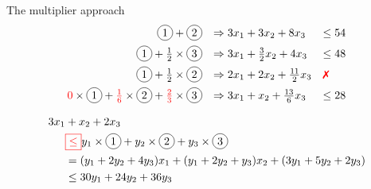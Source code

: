\begin{frame}{The multiplier approach}
  \begin{equation*}
	\setlength\arraycolsep{5pt}
	\begin{array}{rll}
	  \circled{1} + \circled{2} &\Rightarrow	3x_1 + 3x_2 + 8x_3 & \leq 54 \\[5pt]
	  \circled{1} + \frac{1}{2} \times \circled{3} &\Rightarrow 3x_1 + \frac{3}{2}x_2 + 4x_3 & \leq 48 \\[5pt]
	  \circled{1} + \frac{1}{2} \times \circled{2} &\Rightarrow 2x_1 + 2x_2 + \frac{11}{2}x_3 & \text{\xmark{}} \\[5pt]
	  \red{0} \times \circled{1} + \red{\frac{1}{6}} \times \circled{2} + \red{\frac{2}{3}} \times \circled{3} &\Rightarrow 3x_1 + x_2 + \frac{13}{6}x_3 & \leq 28
	\end{array}
  \end{equation*}

  \begin{align*}
	3x_1 &+ x_2 + 2x_3	\\
	  &\rbox{\leq} y_1 \times \circled{1} + y_2 \times \circled{2} + y_3 \times \circled{3} \\
	  &= (y_1 + 2y_2 + 4y_3) x_1 + (y_1 + 2y_2 + y_3) x_2 + (3y_1 + 5y_2 + 2y_3)  \\
	  &\leq 30y_1 + 24y_2 + 36y_3
  \end{align*}
\end{frame}
